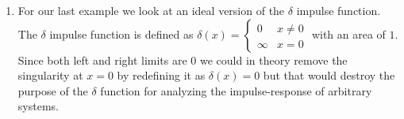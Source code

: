\documentclass[journal]{IEEEtran}
\begin{document}
\begin{enumerate}
\item For our last example we look at an ideal version of the $\delta$ impulse function. The $\delta$ impulse function is defined as
$\delta(x) = \begin{cases}0 &  x \ne 0\\ \infty & x = 0 \end{cases}$ with an area of $1$. Since both left and right limits are $0$ we could in theory remove the singularity at $x = 0$ by redefining it as $\delta(x) = 0$ but that would destroy the purpose of the $\delta$ function for analyzing the impulse-response of arbitrary systems.
\begin{figure}
\centering
{}
\end{figure}
\end{enumerate}
\end{document}
